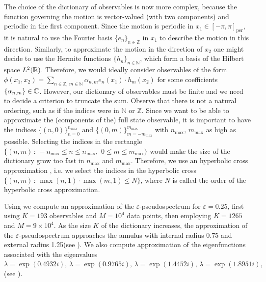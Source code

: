 The choice of the dictionary of observables is now more complex, because the function governing the motion is vector-valued (with two components) and periodic in the first component. Since the motion is periodic in $x_1\in[-\pi,\pi]_{\text{per}}$, it is natural to use the Fourier basis $\{e_n\}_{n\in\mathbb{Z}}$ in $x_1$ to describe the motion in this direction. Similarly, to approximate the motion in the direction of $x_2$ one might decide to use the Hermite functions $\{h_n\}_{n\in\mathbb{N}}$, which form a basis of the Hilbert space $L^2(\mathbb{R})$. Therefore, we would ideally consider observables of the form $\phi(x_1, x_2) = \sum_{n\in\mathbb{Z},\,m\in\mathbb{N}} \alpha_{n,m} e_n(x_1)\cdot h_m(x_2)$ for some coefficients $\{\alpha_{n,m}\}\in\mathbb{C}$. However, our dictionary of observables must be finite and we need to decide a criterion to truncate the sum. Observe that there is not a natural ordering, such as if the indices were in $\mathbb{N}$ or $\mathbb{Z}$. Since we want to be able to approximate the (components of the) full state observable, it is important to have the indices $\{(n,0)\}_{n=0}^{n_{\max}}$ and $\{(0,m)\}_{m=-m_{\max}}^{m_{\max}}$ with $n_{\max},\,m_{\max}$ as high as possible. Selecting the indices in the rectangle $\{(n,m)\,:\,-n_{\max}\leq n\leq n_{\max},\,\, 0\leq m\leq m_{\max}\}$ would make the size of the dictionary grow too fast in $n_{\max}$ and $m_{\max}$. Therefore, we use an hyperbolic cross approximation \cite{dung_hyperbolic_2017}, i.e. we select the indices in the hyperbolic cross $\{(n,m)\,:\, \max(n,1)\cdot \max(m,1)\leq N \}$, where $N$ is called the order of the hyperbolic cross approximation.

Using  we compute an approximation of the $\varepsilon$-pseudospectrum for $\varepsilon = 0.25$, first using $K=193$ observables and $M = 10^4$ data points, then employing $K=1265$ and $M = 9 \times 10^4$. As the size $K$ of the dictionary increases, the approximation of the $\varepsilon$-pseudospectrum approaches the annulus with internal radius 0.75 and external radius 1.25(see ). We also compute approximation of the eigenfunctions associated with the eigenvalues $\lambda = \exp(0.4932 i), \,\lambda = \exp(0.9765 i), \,\lambda = \exp(1.4452 i), \,\lambda = \exp(1.8951 i), \,$ (see ).

